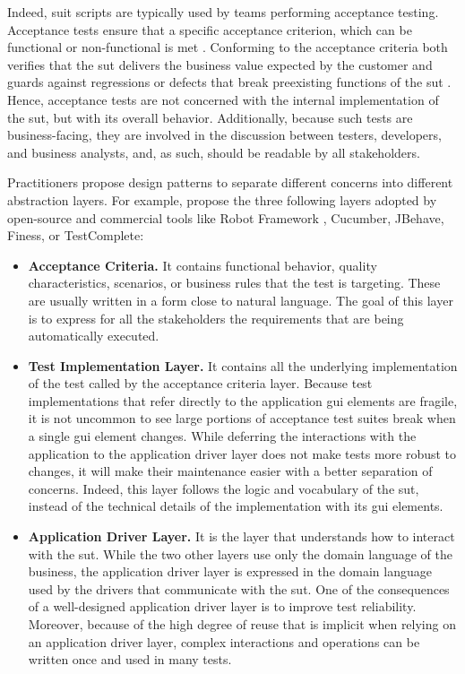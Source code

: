 Indeed, \gls{suit} scripts are typically used by teams performing acceptance testing. Acceptance tests ensure that a specific acceptance criterion, which can be functional or non-functional is met \cite{Pandit2015}. Conforming to the acceptance criteria both verifies that the \gls{sut} delivers the business value expected by the customer and guards against regressions or defects that break preexisting functions of the \gls{sut} \cite{Humble2010}. Hence, acceptance tests are not concerned with the internal implementation of the \gls{sut}, but with its overall behavior. Additionally, because such tests are business-facing, they are involved in the discussion between testers, developers, and business analysts, and, as such, should be readable by all stakeholders.

Practitioners propose design patterns to separate different concerns into different abstraction layers. For example, \textcite{Humble2010} propose the three following layers adopted by open-source and commercial tools like Robot Framework \cite{RobotFramework2020}, Cucumber, JBehave, Finess, or TestComplete:

\begin{itemize}
    \item \textbf{Acceptance Criteria.} It contains functional behavior, quality characteristics, scenarios, or business rules that the test is targeting. These are usually written in a form close to natural language. The goal of this layer is to express for all the stakeholders the requirements that are being automatically executed.
    
    \item \textbf{Test Implementation Layer.} It contains all the underlying implementation of the test called by the acceptance criteria layer. Because test implementations that refer directly to the application \gls{gui} elements are fragile, it is not uncommon to see large portions of acceptance test suites break when a single \gls{gui} element changes. While deferring the interactions with the application to the application driver layer does not make tests more robust to changes, it will make their maintenance easier with a better separation of concerns. Indeed, this layer follows the logic and vocabulary of the \gls{sut}, instead of the technical details of the implementation with its \gls{gui} elements.
    
    \item \textbf{Application Driver Layer.} It is the layer that understands how to interact with the \gls{sut}. While the two other layers use only the domain language of the business, the application driver layer is expressed in the domain language used by the drivers that communicate with the \gls{sut}. One of the consequences of a well-designed application driver layer is to improve test reliability. Moreover, because of the high degree of reuse that is implicit when relying on an application driver layer, complex interactions and operations can be written once and used in many tests.

\end{itemize}

